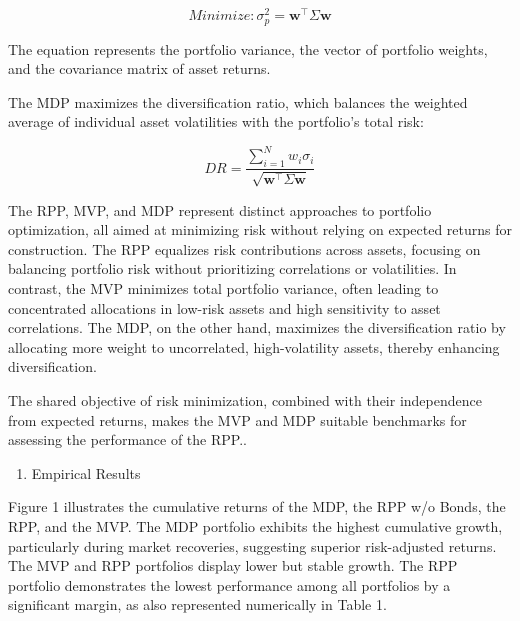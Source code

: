 \documentclass[11pt,preprint]{elsarticle}
\numberwithin{equation}{section}
\numberwithin{figure}{section}
\numberwithin{table}{section}
\def\tightlist{} %
\begin{document}
\begin{equation}
{Minimize:} \sigma_p^2 = \mathbf{w}^\top \Sigma \mathbf{w}
\end{equation}

The equation represents the portfolio variance, the vector of portfolio
weights, and the covariance matrix of asset returns.

The MDP maximizes the diversification ratio, which balances the weighted
average of individual asset volatilities with the portfolio's total
risk:

\begin{equation}
{DR} = \frac{\sum_{i=1}^{N} w_i \sigma_i}{\sqrt{\mathbf{w}^\top \Sigma \mathbf{w}}}
\end{equation}

The RPP, MVP, and MDP represent distinct approaches to portfolio
optimization, all aimed at minimizing risk without relying on expected
returns for construction. The RPP equalizes risk contributions across
assets, focusing on balancing portfolio risk without prioritizing
correlations or volatilities. In contrast, the MVP minimizes total
portfolio variance, often leading to concentrated allocations in
low-risk assets and high sensitivity to asset correlations. The MDP, on
the other hand, maximizes the diversification ratio by allocating more
weight to uncorrelated, high-volatility assets, thereby enhancing
diversification.

The shared objective of risk minimization, combined with their
independence from expected returns, makes the MVP and MDP suitable
benchmarks for assessing the performance of the RPP..

\begin{enumerate}
\def\labelenumi{\arabic{enumi}.}
\setcounter{enumi}{4}
\tightlist
\item
  Empirical Results
\end{enumerate}

Figure 1 illustrates the cumulative returns of the MDP, the RPP w/o
Bonds, the RPP, and the MVP. The MDP portfolio exhibits the highest
cumulative growth, particularly during market recoveries, suggesting
superior risk-adjusted returns. The MVP and RPP portfolios display lower
but stable growth. The RPP portfolio demonstrates the lowest performance
among all portfolios by a significant margin, as also represented
numerically in Table 1.
\end{document}
